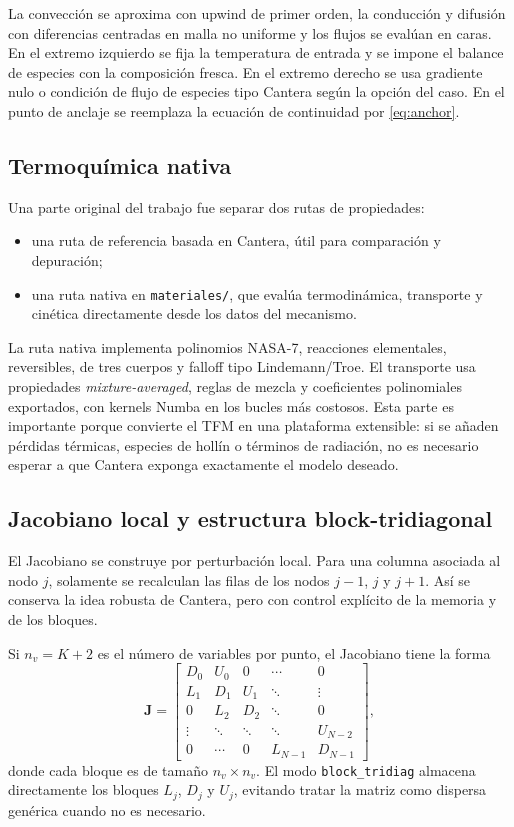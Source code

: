 \documentclass[12pt,a4paper]{article}
\begin{document}
La convección se aproxima con upwind de primer orden, la conducción y difusión con diferencias centradas en malla no uniforme y los flujos se evalúan en caras. En el extremo izquierdo se fija la temperatura de entrada y se impone el balance de especies con la composición fresca. En el extremo derecho se usa gradiente nulo o condición de flujo de especies tipo Cantera según la opción del caso. En el punto de anclaje se reemplaza la ecuación de continuidad por \eqref{eq:anchor}.

\subsection{Termoquímica nativa}

Una parte original del trabajo fue separar dos rutas de propiedades:

\begin{itemize}
  \item una ruta de referencia basada en Cantera, útil para comparación y depuración;
  \item una ruta nativa en \texttt{materiales/}, que evalúa termodinámica, transporte y cinética directamente desde los datos del mecanismo.
\end{itemize}

La ruta nativa implementa polinomios NASA-7, reacciones elementales, reversibles, de tres cuerpos y falloff tipo Lindemann/Troe. El transporte usa propiedades \textit{mixture-averaged}, reglas de mezcla y coeficientes polinomiales exportados, con kernels Numba en los bucles más costosos. Esta parte es importante porque convierte el TFM en una plataforma extensible: si se añaden pérdidas térmicas, especies de hollín o términos de radiación, no es necesario esperar a que Cantera exponga exactamente el modelo deseado.

\subsection{Jacobiano local y estructura block-tridiagonal}

El Jacobiano se construye por perturbación local. Para una columna asociada al nodo $j$, solamente se recalculan las filas de los nodos $j-1$, $j$ y $j+1$. Así se conserva la idea robusta de Cantera, pero con control explícito de la memoria y de los bloques.

Si $n_v=K+2$ es el número de variables por punto, el Jacobiano tiene la forma
\begin{equation}
  \mathbf{J}
  =
  \begin{bmatrix}
  D_0 & U_0 & 0 & \cdots & 0\\
  L_1 & D_1 & U_1 & \ddots & \vdots\\
  0 & L_2 & D_2 & \ddots & 0\\
  \vdots & \ddots & \ddots & \ddots & U_{N-2}\\
  0 & \cdots & 0 & L_{N-1} & D_{N-1}
  \end{bmatrix},
  \label{eq:blocktridiag}
\end{equation}
donde cada bloque es de tamaño $n_v\times n_v$. El modo \texttt{block\_tridiag} almacena directamente los bloques $L_j$, $D_j$ y $U_j$, evitando tratar la matriz como dispersa genérica cuando no es necesario.
\end{document}
